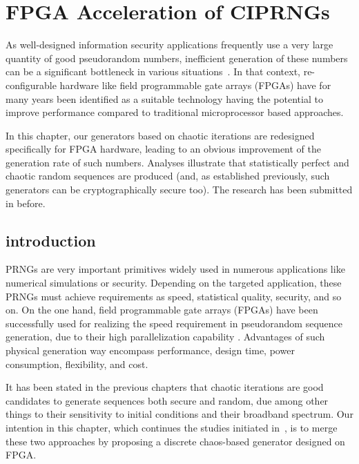 \chapter{FPGA Acceleration of CIPRNGs}
\label{FPGA Acceleration of CIPRNGs}

As well-designed information security 
applications frequently use a very large quantity of good 
pseudorandom numbers, inefficient generation of 
these numbers can be a significant bottleneck 
in various situations~\cite{Porter198443,Batina20031,Carroll1990613,Liu2012331}. 
In that context, re-configurable hardware like field programmable gate arrays (FPGAs)
 have for many years been identified as a suitable technology having the potential to improve performance compared to traditional microprocessor based approaches. 

In this chapter, %
our generators based on chaotic 
iterations are redesigned specifically for FPGA hardware, 
leading to an obvious improvement of the 
generation rate of such numbers. Analyses illustrate that 
statistically perfect and chaotic random sequences 
are produced (and, as established previously, such 
generators can be cryptographically secure too).
The research has been submitted in \cite{submit1, submit3} before.

\section{introduction}
PRNGs are very important primitives widely used 
in numerous applications like numerical simulations or security.
Depending on the targeted application, these PRNGs must achieve requirements
as speed, statistical quality, security, and so on. 
On the one hand, field programmable gate arrays (FPGAs) have been successfully used for realizing 
the speed requirement in pseudorandom sequence generation, due to their high parallelization capability \cite{Bojani200663, Danger:2009:HST:1645457.1645933, Tsoi:2003:CFT:938383.938400}. Advantages of such physical generation way encompass performance, design time, power consumption, flexibility, and cost.


It has been stated in the previous chapters that chaotic iterations are
good candidates to generate  sequences both secure and random,
due among other things to
their sensitivity to initial conditions and their broadband spectrum. 
Our intention in this chapter, which continues the studies initiated 
in~\cite{DBLP:journals/corr/abs-1112-5239}, is to merge these two approaches by
proposing a discrete chaos-based generator
designed on FPGA.

